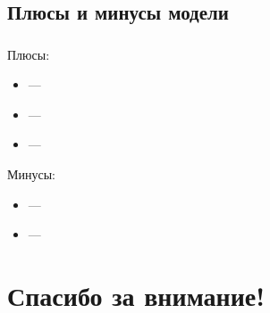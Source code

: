 \documentclass[t]{beamer}
\begin{document}
\subsection{Плюсы и минусы модели}
\begin{frame}
\frametitle{\insertsection}
\framesubtitle{\insertsubsection}

Плюсы:
\begin{itemize}
	\item ---
	\item ---
	\item ---
\end{itemize}

Минусы:
\begin{itemize}
	\item ---
	\item ---
\end{itemize}

\end{frame}



\section{Спасибо за внимание!}
\begin{frame}
\frametitle{\insertsection}
\end{frame}			
\end{document}
